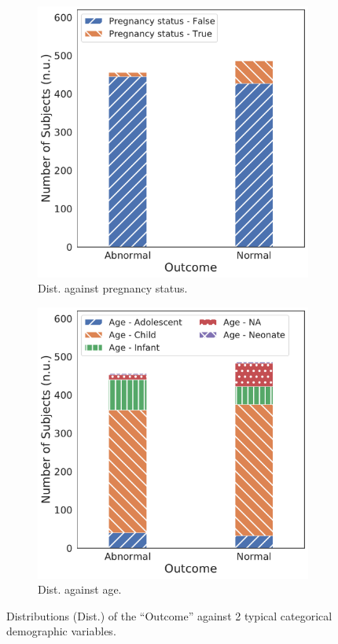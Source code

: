 \begin{figure}[!htp]
\centering
\begin{subfigure}[t]{0.49\linewidth}
    \centering
    \includegraphics[width=\textwidth]{images/outcome_pregnancy_status_corr.pdf}
    \caption[]
    {Dist. against pregnancy status.}
    \label{fig:outcome_pregnancy_status_corr}
\end{subfigure}
\hfill
\begin{subfigure}[t]{0.49\linewidth}
    \centering
    \includegraphics[width=\textwidth]{images/outcome_age_corr.pdf}
    \caption[]
    {Dist. against age.}
    \label{fig:outcome_age_corr}
\end{subfigure}
\caption[]
{Distributions (Dist.) of the ``Outcome'' against 2 typical categorical demographic variables.}
\label{fig:outcome_corr}
\end{figure}
